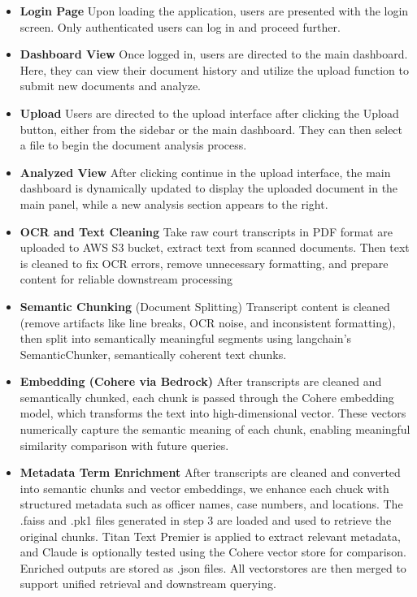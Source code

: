 \documentclass[11pt]{article}
\begin{document}
\begin{itemize}
    \item \textbf{Login Page} 
    Upon loading the application, users are presented with the login screen. Only authenticated users can log in and proceed further.

    \item \textbf{Dashboard View}
    Once logged in, users are directed to the main dashboard.
    Here, they can view their document history and utilize the
    upload function to submit new documents and analyze.

    \item \textbf{Upload} 
    Users are directed to the upload interface after clicking
    the Upload button, either from the sidebar or the main
    dashboard. They can then select a file to begin the
    document analysis process.

    \item \textbf{Analyzed View}
    After clicking continue in the upload interface, the main
    dashboard is dynamically updated to display the uploaded
    document in the main panel, while a new analysis section
    appears to the right.

    \item \textbf{OCR and Text Cleaning}
    Take raw court transcripts in PDF format are uploaded to AWS
    S3 bucket, extract text from scanned documents. Then text is cleaned to fix OCR errors, remove unnecessary formatting, and prepare content for reliable
    downstream processing

    \item \textbf{Semantic Chunking} (Document Splitting)
    Transcript content is cleaned (remove artifacts like line
    breaks, OCR noise, and inconsistent formatting), then split into
    semantically meaningful segments using langchain’s
    SemanticChunker, semantically coherent text chunks.

    \item \textbf{Embedding (Cohere via Bedrock)}
        After transcripts are cleaned and semantically
        chunked, each chunk is passed through the
        Cohere embedding model, which transforms
        the text into high-dimensional vector. These
        vectors numerically capture the semantic
        meaning of each chunk, enabling meaningful
        similarity comparison with future queries.

    \item \textbf{Metadata Term Enrichment}
        After transcripts are cleaned and converted into
        semantic chunks and vector embeddings, we
        enhance each chuck with structured metadata
        such as officer names, case numbers, and
        locations. The .faiss and .pk1 files generated in
        step 3 are loaded and used to retrieve the original
        chunks. Titan Text Premier is applied to extract
        relevant metadata, and Claude is optionally
        tested using the Cohere vector store for
        comparison. Enriched outputs are stored as .json
        files. All vectorstores are then merged to support
        unified retrieval and downstream querying.


\end{itemize}
\end{document}

